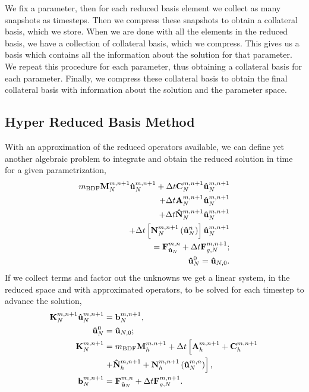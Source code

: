 \documentclass[../../thesis.tex]{subfiles}
\newcommand{\dt}{\ensuremath{\Delta t}}
\newcommand{\Ahm}[1]{\ensuremath{\vb{#1}^{m, n+1}_h}}
\begin{document}
We fix a parameter, then for each reduced basis element we collect as many snapshots
as timesteps.
Then we compress these snapshots to obtain a collateral basis, which we store.
When we are done with all the elements in the reduced basis, 
we have a collection of collateral basis, which we compress.
This gives us a basis which contains all the information about the solution for 
that parameter.
We repeat this procedure for each parameter, thus obtaining a collateral basis 
for each parameter.
Finally, we compress these collateral basis to obtain the final collateral basis
with information about the solution and the parameter space. 

\subsection{Hyper Reduced Basis Method}
With an approximation of the reduced operators available, 
we can define yet another algebraic problem to integrate and 
obtain the reduced solution in time for a given parametrization,
\begin{subequations}
    \label{eq:1d_hrom_weak_formulation_discrete}
    \begin{align}
        m_{\text{BDF}} \vb{M}^{m, n+1}_{N} \vb{\hat{u}}_{N}^{m, n+1}
        + \dt \vb{C}^{m, n+1}_{N} \vb{\hat{u}}_{N}^{m, n+1}
        \nonumber 
        \\ 
        + \dt \vb{A}^{m, n+1}_{N} \vb{\hat{u}}_{N}^{m, n+1}
        \nonumber 
        \\ 
        + \dt \vb{\hat{N}}^{m, n+1}_{N} \vb{\hat{u}}_{N}^{m, n+1}
        \nonumber 
        \\ 
        + \dt \left[\vb{N}^{m, n+1}_{N}\left(\vb{\hat{u}}_{N}^{n}\right)\right] \vb{\hat{u}}_{N}^{m, n+1}
        \nonumber
        \\
        = \vb{F}_{\vb{\hat{u}}_{N}}^{m, n}
        + \dt \vb{F}_{g,N}^{m, n+1};
        \\
        \vb{\hat{u}}_N^{0} = \vb{\hat{u}}_{N,0}.
    \end{align}
\end{subequations}
If we collect terms and factor out the unknowns we get a linear system, in the reduced space and with approximated operators, to be solved for each timestep to advance the solution,
\begin{subequations}
    \label{eq:1d_hrom_linear_system_timestep}
    \begin{align}
        \vb{K}_{N}^{m, n+1} \vb{\hat{u}}_{N}^{m, n+1} &= \vb{b}_{N}^{m, n+1}, 
        \\
        \vb{\hat{u}}_{N}^{0} &= \vb{\hat{u}}_{N,0};
        \\
        \vb{K}_{N}^{m, n+1} &= m_{\text{BDF}} \Ahm{M} + \dt \left[\Ahm{A} + \Ahm{C} \right. 
        \nonumber 
        \\
                        &\left. + \Ahm{\hat{N}} + \Ahm{N}\left(\vb{\hat{u}}_{N}^{m, n}\right)\right],
        \\
        \vb{b}_{N}^{m, n+1} &= \vb{F}_{\vb{\hat{u}}_{N}}^{m,n} + \dt \vb{F}_{g,N}^{m, n+1}.
    \end{align}
\end{subequations}
\end{document}
